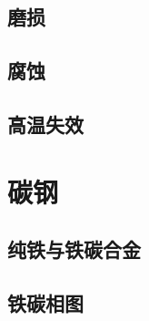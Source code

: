 \documentclass[12pt,a4paper]{article}
\begin{document}
\subsection{磨损}

\subsection{腐蚀}

\subsection{高温失效}


\section{碳钢}

\subsection{纯铁与铁碳合金}

\subsection{铁碳相图}
\end{document}
